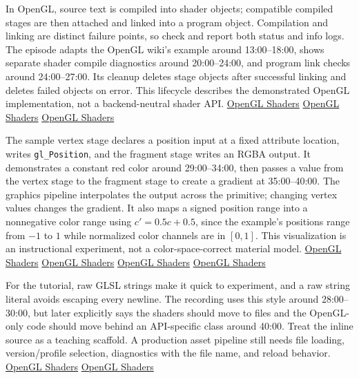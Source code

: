 In OpenGL, source text is compiled into shader objects; compatible compiled stages are then attached and linked into a program object. Compilation and linking are distinct failure points, so check and report both status and info logs. The episode adapts the OpenGL wiki's example around 13:00--18:00, shows separate shader compile diagnostics around 20:00--24:00, and program link checks around 24:00--27:00. Its cleanup deletes stage objects after successful linking and deletes failed objects on error. This lifecycle describes the demonstrated OpenGL implementation, not a backend-neutral shader API. \href{https://www.youtube.com/watch?v=QBCCHm_9HV8&t=780s}{OpenGL Shaders} \href{https://www.youtube.com/watch?v=QBCCHm_9HV8&t=1200s}{OpenGL Shaders} \href{https://www.youtube.com/watch?v=QBCCHm_9HV8&t=1440s}{OpenGL Shaders}

The sample vertex stage declares a position input at a fixed attribute location, writes \texttt{gl\_Position}, and the fragment stage writes an RGBA output. It demonstrates a constant red color around 29:00--34:00, then passes a value from the vertex stage to the fragment stage to create a gradient at 35:00--40:00. The graphics pipeline interpolates the output across the primitive; changing vertex values changes the gradient. It also maps a signed position range into a nonnegative color range using \(c'=0.5c+0.5\), since the example's positions range from \(-1\) to \(1\) while normalized color channels are in \([0,1]\). This visualization is an instructional experiment, not a color-space-correct material model. \href{https://www.youtube.com/watch?v=QBCCHm_9HV8&t=1740s}{OpenGL Shaders} \href{https://www.youtube.com/watch?v=QBCCHm_9HV8&t=2040s}{OpenGL Shaders} \href{https://www.youtube.com/watch?v=QBCCHm_9HV8&t=2220s}{OpenGL Shaders} \href{https://www.youtube.com/watch?v=QBCCHm_9HV8&t=2340s}{OpenGL Shaders}

For the tutorial, raw GLSL strings make it quick to experiment, and a raw string literal avoids escaping every newline. The recording uses this style around 28:00--30:00, but later explicitly says the shaders should move to files and the OpenGL-only code should move behind an API-specific class around 40:00. Treat the inline source as a teaching scaffold. A production asset pipeline still needs file loading, version/profile selection, diagnostics with the file name, and reload behavior. \href{https://www.youtube.com/watch?v=QBCCHm_9HV8&t=1680s}{OpenGL Shaders} \href{https://www.youtube.com/watch?v=QBCCHm_9HV8&t=2400s}{OpenGL Shaders}

